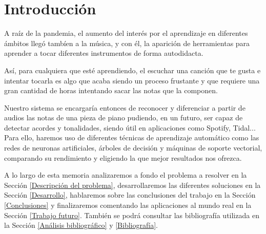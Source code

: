 \documentclass[12pt]{article}
\begin{document}
\section{Introducción}

A raíz de la pandemia, el aumento del interés por el aprendizaje en diferentes ámbitos llegó tambíen a la música, y con él, la aparición
de herramientas para aprender a tocar diferentes instrumentos de forma autodidacta.

\bigskip
Así, para cualquiera que esté aprendiendo, el escuchar una canción que te gusta e intentar tocarla es algo que acaba siendo un proceso
frustante y que requiere una gran cantidad de horas intentando sacar las notas que la componen.

\bigskip
Nuestro sistema se encargaría entonces de reconocer y diferenciar a partir de audios las notas de una pieza de piano
pudiendo, en un futuro, ser capaz de detectar acordes y tonalidades, siendo útil en aplicaciones como Spotify, Tidal... Para ello, haremos uso
de diferentes técnicas de aprendizaje automático como las redes de neuronas artificiales, árboles de decisión y máquinas de soporte vectorial,
comparando su rendimiento y eligiendo la que mejor resultados nos ofrezca.

\bigskip
A lo largo de esta memoria analizaremos a fondo el problema a resolver en la Sección \ref{Descripción del problema}, desarrollaremos las diferentes soluciones en la
Sección \ref{Desarrollo}, hablaremos sobre las conclusiones del trabajo en la Sección \ref{Conclusiones} y finalizaremos comentando las aplicaciones al mundo
real en la Sección \ref{Trabajo futuro}. También se podrá consultar las bibliografía utilizada en la Sección \ref{Análisis bibliográfico} y \ref{Bibliografía}.
\end{document}
